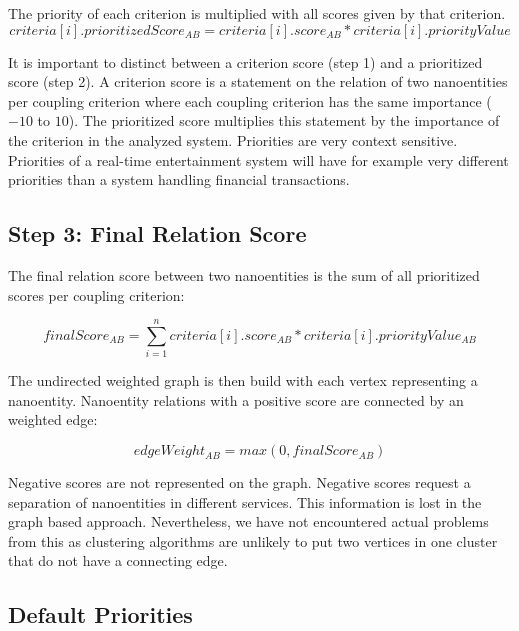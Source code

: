 The priority of each criterion is multiplied with all scores given by that criterion. 
\begin{displaymath}
	criteria[i].prioritizedScore_{AB} = criteria[i].score_{AB} * criteria[i].priorityValue
\end{displaymath}

It is important to distinct between a criterion score (step 1) and a prioritized score (step 2). A criterion score is a statement on the relation of two nanoentities per coupling criterion where each coupling criterion has the same importance ($-10$ to $10$). The prioritized score multiplies this statement by the importance of the criterion in the analyzed system. Priorities are very context sensitive. Priorities of a real-time entertainment system will have for example very different priorities than a system handling financial transactions. 

\subsection{Step 3: Final Relation Score}

The final relation score between two nanoentities is the sum of all prioritized scores per coupling criterion: 

\begin{displaymath}
finalScore_{AB} = \sum\limits_{i=1}^n criteria[i].score_{AB} * criteria[i].priorityValue_{AB}
\end{displaymath}

The undirected weighted graph is then build with each vertex representing a nanoentity. Nanoentity relations with a positive score are connected by an weighted edge:

\begin{displaymath}
edgeWeight_{AB} = max(0, finalScore_{AB})	
\end{displaymath}

Negative scores are not represented on the graph. Negative scores request a separation of nanoentities in different services. This information is lost in the graph based approach. Nevertheless, we have not encountered actual problems from this as clustering algorithms are unlikely to put two vertices in one cluster that do not have a connecting edge.
	
\subsection{Default Priorities}


